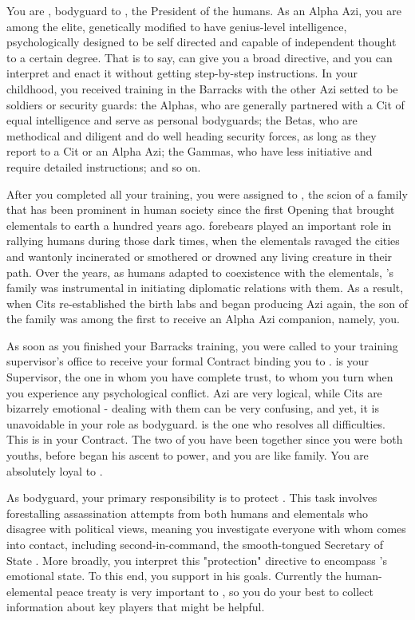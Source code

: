 \documentclass[char]{elementals}
\begin{document}
\name{\cRomeo{}}

You are \cRomeo{\intro}, bodyguard to \cLeader{\intro}, the President of the humans.  As an Alpha Azi, you are among the elite, genetically modified to have genius-level intelligence, psychologically designed to be self directed and capable of independent thought to a certain degree.  That is to say, \cLeader{} can give you a broad directive, and you can interpret and enact it without getting step-by-step instructions.  In your childhood, you received training in the Barracks with the other Azi setted to be soldiers or security guards: the Alphas, who are generally partnered with a Cit of equal intelligence and serve as personal bodyguards; the Betas, who are methodical and diligent and do well heading security forces, as long as they report to a Cit or an Alpha Azi; the Gammas, who have less initiative and require detailed instructions; and so on.

After you completed all your training, you were assigned to \cLeader{}, the scion of a family that has been prominent in human society since the first Opening that brought elementals to earth a hundred years ago.  \cLeader{\Their} forebears played an important role in rallying humans during those dark times, when the elementals ravaged the cities and wantonly incinerated or smothered or drowned any living creature in their path.  Over the years, as humans adapted to coexistence with the elementals, \cLeader{}'s family was instrumental in initiating diplomatic relations with them.  As a result, when Cits re-established the birth labs and began producing Azi again, the son of the \cLeader{\last} family was among the first to receive an Alpha Azi companion, namely, you.

As soon as you finished your Barracks training, you were called to your training supervisor's office to receive your formal Contract binding you to \cLeader{}.  \cLeader{\They} is your Supervisor, the one in whom you have complete trust, to whom you turn when you experience any psychological conflict.  Azi are very logical, while Cits are bizarrely emotional - dealing with them can be very confusing, and yet, it is unavoidable in your role as bodyguard.  \cLeader{} is the one who resolves all difficulties.  This is in your Contract.  The two of you have been together since you were both youths, before \cLeader{\they} began his ascent to power, and you are like family.  You are absolutely loyal to \cLeader{\them}.

As \cLeader{\their} bodyguard, your primary responsibility is to protect \cLeader{\them}.  This task involves forestalling assassination attempts from both humans and elementals who disagree with \cLeader{\their} political views, meaning you investigate everyone with whom \cLeader{\they} comes into contact, including \cLeader{\their} second-in-command, the smooth-tongued Secretary of State \cDema{\intro}.  More broadly, you interpret this "protection" directive to encompass \cLeader{}'s emotional state.  To this end, you support \cLeader{\them} in his goals.  Currently the human-elemental peace treaty is very important to \cLeader{\them}, so you do your best to collect information about key players that might be helpful.
\end{document}
